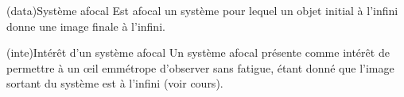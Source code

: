 \documentclass[../../main/main.tex]{subfiles}
\begin{document}
{	\subsubsection{}
	\begin{tcbraster}[raster columns=2, raster equal height=rows]
		\begin{tcb}(data){Système afocal}
			Est afocal un système pour lequel un objet initial à l'infini donne une
			image finale à l'infini.
		\end{tcb}
		\begin{tcb}(inte){Intérêt d'un système afocal}
			Un système afocal présente comme intérêt de permettre à un œil emmétrope
			d'observer sans fatigue, étant donné que l'image sortant du système est à
			l'infini (voir cours).
		\end{tcb}
	\end{tcbraster}

	\subsubsection{}\label{sssec:k_encomb}

}
\end{document}
